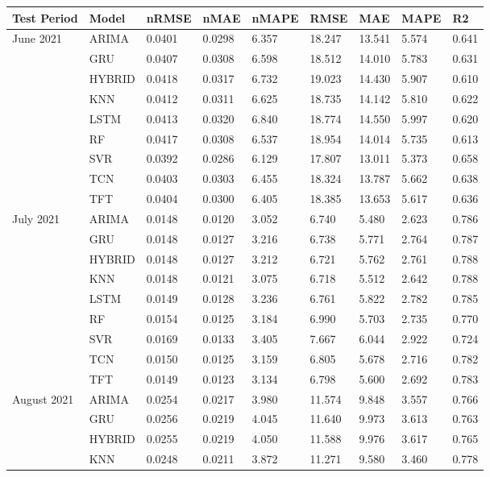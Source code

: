 \begin{tabular}{lllllllll}
\toprule
Test Period & Model & nRMSE & nMAE & nMAPE & RMSE & MAE & MAPE & R2 \\
\midrule
June 2021 & ARIMA & 0.0401 & 0.0298 & 6.357 & 18.247 & 13.541 & 5.574 & 0.641 \\
 & GRU & 0.0407 & 0.0308 & 6.598 & 18.512 & 14.010 & 5.783 & 0.631 \\
 & HYBRID & 0.0418 & 0.0317 & 6.732 & 19.023 & 14.430 & 5.907 & 0.610 \\
 & KNN & 0.0412 & 0.0311 & 6.625 & 18.735 & 14.142 & 5.810 & 0.622 \\
 & LSTM & 0.0413 & 0.0320 & 6.840 & 18.774 & 14.550 & 5.997 & 0.620 \\
 & RF & 0.0417 & 0.0308 & 6.537 & 18.954 & 14.014 & 5.735 & 0.613 \\
 & SVR & 0.0392 & 0.0286 & 6.129 & 17.807 & 13.011 & 5.373 & 0.658 \\
 & TCN & 0.0403 & 0.0303 & 6.455 & 18.324 & 13.787 & 5.662 & 0.638 \\
 & TFT & 0.0404 & 0.0300 & 6.405 & 18.385 & 13.653 & 5.617 & 0.636 \\
July 2021 & ARIMA & 0.0148 & 0.0120 & 3.052 & 6.740 & 5.480 & 2.623 & 0.786 \\
 & GRU & 0.0148 & 0.0127 & 3.216 & 6.738 & 5.771 & 2.764 & 0.787 \\
 & HYBRID & 0.0148 & 0.0127 & 3.212 & 6.721 & 5.762 & 2.761 & 0.788 \\
 & KNN & 0.0148 & 0.0121 & 3.075 & 6.718 & 5.512 & 2.642 & 0.788 \\
 & LSTM & 0.0149 & 0.0128 & 3.236 & 6.761 & 5.822 & 2.782 & 0.785 \\
 & RF & 0.0154 & 0.0125 & 3.184 & 6.990 & 5.703 & 2.735 & 0.770 \\
 & SVR & 0.0169 & 0.0133 & 3.405 & 7.667 & 6.044 & 2.922 & 0.724 \\
 & TCN & 0.0150 & 0.0125 & 3.159 & 6.805 & 5.678 & 2.716 & 0.782 \\
 & TFT & 0.0149 & 0.0123 & 3.134 & 6.798 & 5.600 & 2.692 & 0.783 \\
August 2021 & ARIMA & 0.0254 & 0.0217 & 3.980 & 11.574 & 9.848 & 3.557 & 0.766 \\
 & GRU & 0.0256 & 0.0219 & 4.045 & 11.640 & 9.973 & 3.613 & 0.763 \\
 & HYBRID & 0.0255 & 0.0219 & 4.050 & 11.588 & 9.976 & 3.617 & 0.765 \\
 & KNN & 0.0248 & 0.0211 & 3.872 & 11.271 & 9.580 & 3.460 & 0.778 \\

\end{tabular}
